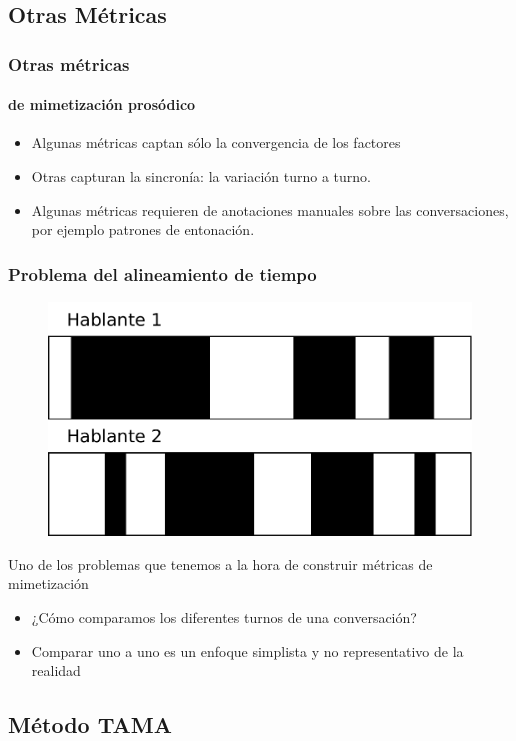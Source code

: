 
\subsection{Otras Métricas }

\begin{frame}
  \frametitle{Otras métricas}
  \framesubtitle{de mimetización prosódico}
  \begin{itemize}
    \item Algunas métricas captan sólo la convergencia de los factores
    \item Otras capturan la sincronía: la variación turno a turno.
    \item Algunas métricas requieren de anotaciones manuales sobre las conversaciones, por ejemplo patrones de entonación.
  \end{itemize}

\end{frame}


\begin{frame}
  \frametitle{Problema del alineamiento de tiempo}

  \begin{figure}[t]
    \includegraphics[scale=0.40]{images/conversation_turns.pdf}
  \end{figure}
  Uno de los problemas que tenemos a la hora de construir métricas de mimetización

  \begin{itemize}
    \item ¿Cómo comparamos los diferentes turnos de una conversación?
    \item Comparar uno a uno es un enfoque simplista y no representativo de la realidad
  \end{itemize}
\end{frame}


\subsection{Método TAMA}

